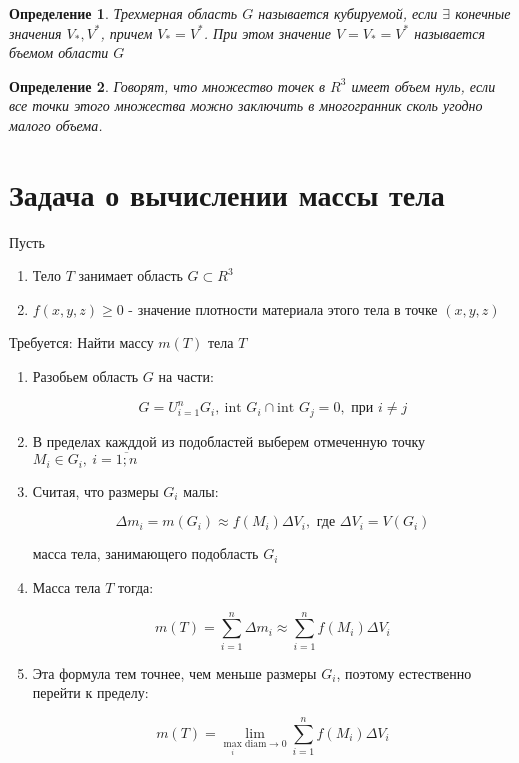 \documentclass[a4paper, 14pt]{report}
\newtheorem{defenition}{Определение}[chapter]
\begin{document}
\begin{defenition}
    Трехмерная область $G$ называется кубируемой, если $\exists$ конечные значения $V_*, V^*$, причем $V_* = V^*$. При этом значение $V = V_* = V^*$ называется бъемом области $G$
\end{defenition}

\begin{defenition}
    Говорят, что множество точек в $R^3$ имеет объем нуль, если все точки этого множества можно заключить в многогранник сколь угодно малого объема.
\end{defenition}

\section{Задача о вычислении массы тела}

Пусть 

\begin{enumerate}
    \item Тело $T$ занимает область $G \subset R^3$
    \item $f(x,y,z) \geq 0$ - значение плотности материала этого тела в точке $(x,y,z)$
\end{enumerate}

Требуется: Найти массу $m(T)$ тела $T$

\begin{enumerate}
    \item Разобьем область $G$ на части:

        $$
        G = U_{i=1}^{n} G_i,\ \text{int }G_i \cap \text{int } G_j = 0, \text{ при } i \ne j
        $$

    \item В пределах кажддой из подобластей выберем отмеченную точку $M_i \in G_i,\ i = \overline{1;n}$

    \item Считая, что размеры $G_i$ малы:

        $$
        \Delta m_i = m(G_i) \approx f(M_i) \Delta V_i, \text{ где } \Delta V_i = V(G_i)
        $$

        масса тела, занимающего подобласть $G_i$

    \item Масса тела $T$ тогда:

        $$
        m(T) = \sum_{i=1}^n \Delta m_i \approx \sum_{i=1}^n f(M_i) \Delta V_i
        $$

    \item Эта формула тем точнее, чем меньше размеры $G_i$, поэтому естественно перейти к пределу:

        $$
        m(T) = \underset{ \underset{i}{\text{max}}\text{ diam} \to 0 }{\lim} \sum_{i=1}^n f(M_i) \Delta V_i
        $$
\end{enumerate}
\end{document}
